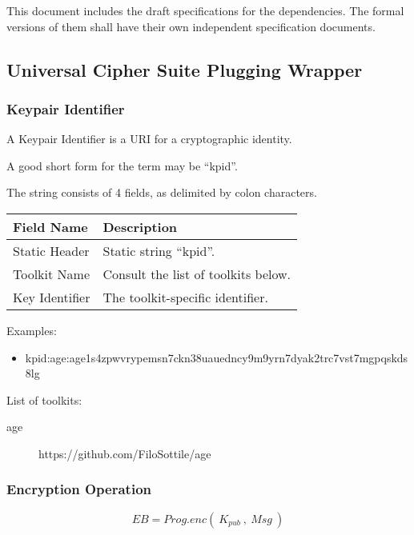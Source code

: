 \documentclass[a4paper,11pt]{article}
\begin{document}
This document includes the draft specifications for the dependencies.
The formal versions of them shall have their own independent specification documents.


\subsection{Universal Cipher Suite Plugging Wrapper}

\subsubsection{Keypair Identifier}

A Keypair Identifier is a URI for a cryptographic identity.

A good short form for the term may be ``kpid''.

The string consists of 4 fields, as delimited by colon characters.

\begin{center}
	\begin{tabu}{ll}
		\toprule
		Field Name     & Description                         \\
		\midrule
		Static Header  & Static string ``kpid''.             \\
		Toolkit Name   & Consult the list of toolkits below. \\
		Key Identifier & The toolkit-specific identifier.    \\
		\bottomrule
	\end{tabu}
\end{center}

Examples:

\begin{itemize}
	\item kpid:age:age1s4zpwvrypemsn7ckn38uauedncy9m9yrn7dyak2trc7vst7mgpqskds8lg
\end{itemize}

List of toolkits:

\begin{description}
	\item[age] https://github.com/FiloSottile/age
\end{description}

\subsubsection{Encryption Operation}

\begin{displaymath}
	EB = Prog.enc(~K_{pub}~,~Msg~)
\end{displaymath}
\end{document}
